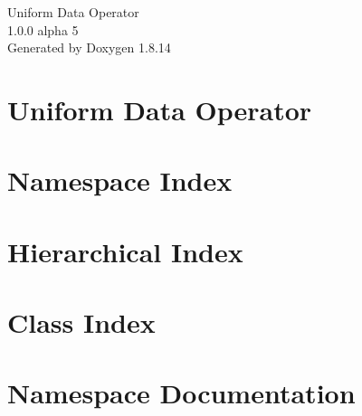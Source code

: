 \documentclass[twoside]{book}
\newcommand{\+}{\discretionary{\mbox{\scriptsize$\hookleftarrow$}}{}{}}
\newcommand{\clearemptydoublepage}{%
  \newpage{\pagestyle{empty}\cleardoublepage}%
}
\begin{document}
\hypersetup{pageanchor=false,
             bookmarksnumbered=true,
             pdfencoding=unicode
            }
\begin{titlepage}
\vspace*{7cm}
\begin{center}%
{\Large Uniform Data Operator \\[1ex]\large 1.\+0.\+0 alpha 5 }\\
\vspace*{1cm}
{\large Generated by Doxygen 1.8.14}\\
\end{center}
\end{titlepage}
\clearemptydoublepage
{}
\tableofcontents
\clearemptydoublepage
{}
\hypersetup{pageanchor=true}

\chapter{Uniform Data Operator}
\label{md__d_1__work__git_hub_uniform-data-operator__r_e_a_d_m_e}

\chapter{Namespace Index}

\chapter{Hierarchical Index}

\chapter{Class Index}

\chapter{Namespace Documentation}











\end{document}
